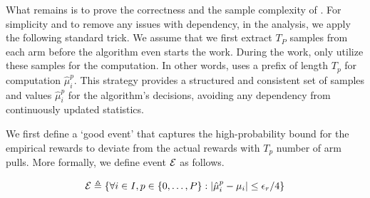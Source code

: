 What remains is to prove the correctness and the sample complexity of . For simplicity and to remove any issues with dependency, in the analysis, we apply the following standard trick. We assume that we first extract \(T_P\) samples from each arm before the algorithm even starts the work. During the work,  only utilize these samples for the computation. In other words, uses a prefix of length \(T_p\) for computation \(\hat\mu^{p}_i\). %
This strategy provides a structured and consistent set of samples and values \(\hat\mu^{p}_i\) for the algorithm's decisions, avoiding any dependency from continuously updated statistics.


We first define a `good event' that captures the high-probability bound for the empirical rewards to deviate from the actual rewards with $T_{p}$ number of arm pulls. More formally, we define event $\mathcal{E}$ as follows.

\begin{align}\label{eq:event-E}
    \mathcal{E} \triangleq \{\forall{i \in I}, p \in \{0, \dotsc, P\} : \left| \hat\mu^p_i - \mu_i \right| \le \epsilon_r / 4\}
\end{align}

